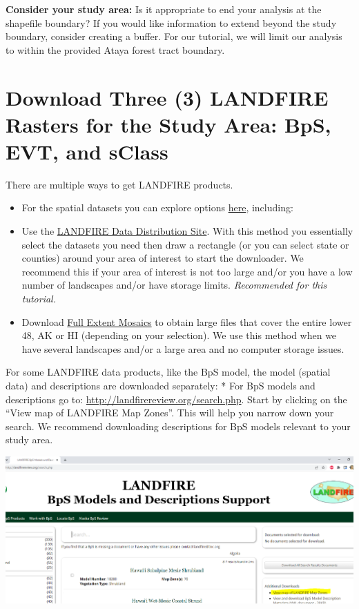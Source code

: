 \documentclass[
]{book}
\providecommand{\tightlist}{%
  \setlength{\itemsep}{0pt}\setlength{\parskip}{0pt}}
\begin{document}
\textbf{Consider your study area:} Is it appropriate to end your analysis at the shapefile boundary? If you would like information to extend beyond the study boundary, consider creating a buffer. For our tutorial, we will limit our analysis to within the provided Ataya forest tract boundary.

\hypertarget{download-three-3-landfire-rasters-for-the-study-area-bps-evt-and-sclass}{%
\section{Download Three (3) LANDFIRE Rasters for the Study Area: BpS, EVT, and sClass}\label{download-three-3-landfire-rasters-for-the-study-area-bps-evt-and-sclass}}

There are multiple ways to get LANDFIRE products.

\begin{itemize}
\tightlist
\item
  For the spatial datasets you can explore options \href{https://www.landfire.gov/getdata.php}{here}, including:
\item
  Use the \href{https://www.landfire.gov/viewer/}{LANDFIRE Data Distribution Site}. With this method you essentially select the datasets you need then draw a rectangle (or you can select state or counties) around your area of interest to start the downloader. We recommend this if your area of interest is not too large and/or you have a low number of landscapes and/or have storage limits. \emph{Recommended for this tutorial.}
\item
  Download \href{https://www.landfire.gov/version_comparison.php}{Full Extent Mosaics} to obtain large files that cover the entire lower 48, AK or HI (depending on your selection). We use this method when we have several landscapes and/or a large area and no computer storage issues.
\end{itemize}

For some LANDFIRE data products, like the BpS model, the model (spatial data) and descriptions are downloaded separately:
* For BpS models and descriptions go to: \url{http://landfirereview.org/search.php}. Start by clicking on the ``View map of LANDFIRE Map Zones''. This will help you narrow down your search. We recommend downloading descriptions for BpS models relevant to your study area.

\includegraphics[width=1000pt]{04_gis_screenshots/2_view_mapzone}
\end{document}
